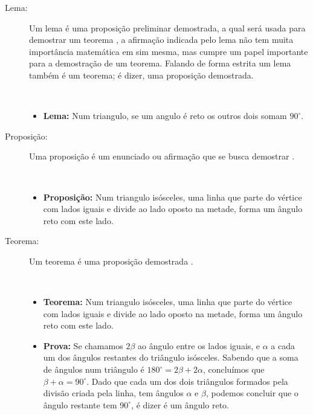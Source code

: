 \begin{description}
\item[Lema:]  Um lema é uma proposição preliminar demostrada, 
a qual será usada para demostrar um teorema \cite[pp. 49]{fossa2009introducao}\cite[pp. 41]{solow1987como},
a afirmação indicada pelo lema não tem muita importância matemática em sim mesma, mas cumpre um papel importante para a demostração de um teorema.
Falando de forma estrita um lema também é um teorema; é dizer, uma proposição demostrada.
\begin{example}~\\
\begin{itemize}
\item \textbf{Lema:} Num triangulo, se um angulo é reto os outros dois somam $90^{\circ}$.
\end{itemize}
\end{example}

\item[Proposição:]  Uma proposição é um enunciado ou afirmação que se busca demostrar \cite[pp. 41]{solow1987como}.
\begin{example}~\\
\begin{itemize}
\item \textbf{Proposição:} Num triangulo isósceles, uma linha que parte do vértice com lados iguais e divide ao lado oposto na metade,
forma um ângulo reto com este lado.
\end{itemize}
\end{example}

\item[Teorema:]  Um teorema é uma proposição demostrada \cite[pp. 49]{fossa2009introducao} \cite[pp. 41]{solow1987como}.
\begin{example}~\\
\begin{itemize}
\item \textbf{Teorema:} Num triangulo isósceles, uma linha que parte do vértice com lados iguais e divide ao lado oposto na metade,
forma um ângulo reto com este lado.
\item \textbf{Prova:}  Se chamamos $2\beta$ ao ângulo entre os lados iguais, 
e $\alpha$ a cada um dos ângulos restantes do triângulo isósceles. Sabendo
que a soma de ângulos num triângulo é $180^{\circ}=2\beta+2\alpha$,
concluímos que $\beta+\alpha=90^{\circ}$.
Dado que cada um dos dois triângulos formados pela divisão criada pela linha, tem ângulos $\alpha$ e $\beta$,
podemos concluir que o ângulo restante tem $90^{\circ}$, é dizer é um ângulo reto.
\end{itemize}
\end{example}


\end{description}
